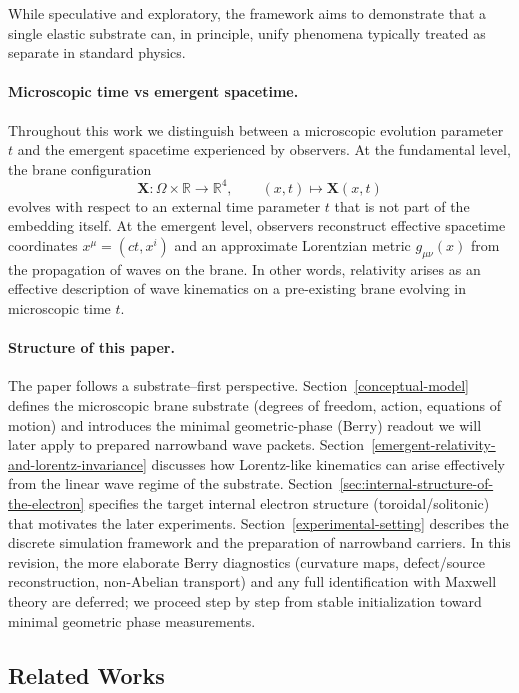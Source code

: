 While speculative and exploratory, the framework aims to demonstrate that a single elastic substrate can, in principle, unify phenomena typically treated as separate in standard physics.

\paragraph{Microscopic time vs emergent spacetime.}
Throughout this work we distinguish between a microscopic evolution parameter $t$ and the emergent spacetime experienced by observers. At the fundamental level, the brane configuration
\[
\mathbf X : \Omega \times \mathbb{R} \to \mathbb{R}^4, \qquad (x,t) \mapsto \mathbf X(x,t)
\]
evolves with respect to an external time parameter $t$ that is not part of the embedding itself. At the emergent level, observers reconstruct effective spacetime coordinates $x^\mu = (ct, x^i)$ and an approximate Lorentzian metric $g_{\mu\nu}(x)$ from the propagation of waves on the brane. In other words, relativity arises as an effective description of wave kinematics on a pre-existing brane evolving in microscopic time $t$.

\paragraph{Structure of this paper.}
The paper follows a substrate--first perspective.
Section~\ref{conceptual-model} defines the microscopic brane substrate (degrees of freedom, action, equations of motion)
and introduces the minimal geometric-phase (Berry) readout we will later apply to prepared narrowband wave packets.
Section~\ref{emergent-relativity-and-lorentz-invariance} discusses how Lorentz-like kinematics can arise effectively from the
linear wave regime of the substrate.
Section~\ref{sec:internal-structure-of-the-electron} specifies the target internal electron structure (toroidal/solitonic)
that motivates the later experiments.
Section~\ref{experimental-setting} describes the discrete simulation framework and the preparation of narrowband carriers.
In this revision, the more elaborate Berry diagnostics (curvature maps, defect/source reconstruction, non-Abelian transport)
and any full identification with Maxwell theory are deferred; we proceed step by step from stable initialization toward
minimal geometric phase measurements.

\subsection{Related Works}\label{related-works}

